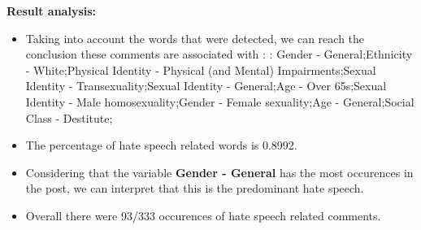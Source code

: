 \documentclass[11pt]{article}
\begin{document}
\textbf{\Large Result analysis:}

\begin{itemize}\item Taking into account the words that were detected, we can reach the conclusion these comments are associated with : : Gender - General;Ethnicity - White;Physical Identity - Physical (and Mental) Impairments;Sexual Identity - Transexuality;Sexual Identity - General;Age - Over 65s;Sexual Identity - Male homosexuality;Gender - Female sexuality;Age - General;Social Class - Destitute;%

\item The percentage of hate speech related words is 0.8992.

\item Considering that the variable \textbf{Gender - General} has the most occurences in the post, we can interpret that this is the predominant hate speech.

\item Overall there were 93/333 occurences of hate speech related comments.\end{itemize}
\end{document}
